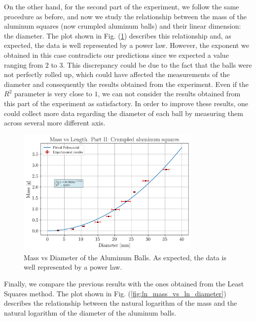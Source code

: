 \documentclass[a4paper,12pt]{article}
\begin{document}
On the other hand, for the second part of the experiment, we follow the same procedure as before, and now we study the relationship between the mass 
of the aluminum squares (now crumpled aluminum balls) and their linear dimension: the diameter. The plot shown in Fig. (\ref{fig:mass_vs_diameter}) 
describes this relationship and, as expected, the data is well represented by a power law. However, the exponent we obtained in this case contradicts our predictions since we expected a value ranging from $2$ to $3$. This discrepancy could be due to the fact that the balls were not perfectly rolled up, which could have affected the measurements of the diameter and consequently the results obtained from the experiment. Even if the $R^2$ parameter is very close to $1$, we can not consider the results obtained from this part of the experiment as satisfactory. In order to improve these results, one could collect more data regarding the diameter of each ball by measuring them across several more different axis. 

\begin{figure}[h!]
    \centering
    \includegraphics[width = 0.8\textwidth]{mass_vs_diameter.png}
    \caption{Mass vs Diameter of the Aluminum Balls. As expected, the data is well represented by a power law.}
    \label{fig:mass_vs_diameter}
\end{figure}

Finally, we compare the previous results with the ones obtained from the Least Squares method. The plot shown in Fig. (\ref{fig:ln_mass_vs_ln_diameter}) describes the relationship between the natural logarithm of the mass and the natural logarithm of the diameter of the aluminum balls.
\end{document}
